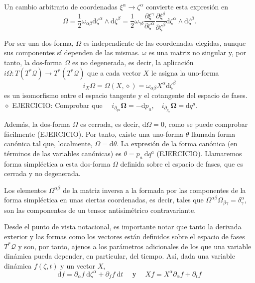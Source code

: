 Un cambio arbitrario de coordenadas $\xi^{\alpha} \rightarrow \zeta^{\alpha}$ convierte esta expresión en
$$
\Omega=\frac{1}{2} \omega_{\alpha \beta} \mathrm{d} \zeta^{\alpha} \wedge \mathrm{d} \zeta^{\beta}=\frac{1}{2} \omega_{\gamma \delta} \frac{\partial \xi^{\gamma}}{\partial \zeta^{\alpha}} \frac{\partial \xi^{\delta}}{\partial \zeta^{\beta}} \mathrm{d} \zeta^{\alpha} \wedge \mathrm{d} \zeta^{\beta} .
$$

Por ser una dos-forma, $\Omega$ es independiente de las coordenadas elegidas, aunque sus componentes sí dependen de las mismas.
$\omega$ es una matriz no singular y, por tanto, la dos-forma $\Omega$ es no degenerada, es decir, la aplicación $i \Omega: T\left(T^{*} \mathscr{Q}\right) \rightarrow T^{*}\left(T^{*} \mathscr{Q}\right)$ que a cada vector $X$ le asigna la uno-forma
$$
i_{X} \Omega=\Omega(X, \diamond)=\omega_{\alpha \beta} X^{\alpha} \mathrm{d} \zeta^{\beta}
$$
es un isomorfismo entre el espacio tangente y el cotangente del espacio de fases. $\diamond$ EJERCICIO: Comprobar que $\quad i_{\partial_{q a}} \boldsymbol{\Omega}=-\mathrm{d} p_{a}, \quad i_{\partial_{p_{a}}} \boldsymbol{\Omega}=\mathrm{d} q^{a}$.

Además, la dos-forma $\Omega$ es cerrada, es decir, $\mathrm{d} \Omega=0$, como se puede comprobar fácilmente (EJERCICIO). Por tanto, existe una uno-forma $\theta$ llamada forma canónica tal que, localmente, $\Omega=\mathrm{d} \theta$. La expresión de la forma canónica (en términos de las variables canónicas) es $\theta=p_{a} \mathrm{~d} q^{a}$ (EJERCICIO). Llamaremos forma simpléctica a esta dos-forma $\Omega$ definida sobre el espacio de fases, que es cerrada y no degenerada.

Los elementos $\Omega^{\alpha \beta}$ de la matriz inversa a la formada por las componentes de la forma simpléctica en unas ciertas coordenadas, es decir, tales que $\Omega^{\alpha \beta} \Omega_{\beta \gamma}=\delta_{\gamma}^{\alpha}$, son las componentes de un tensor antisimétrico contravariante.

Desde el punto de vista notacional, es importante notar que tanto la derivada exterior y las formas como los vectores están definidos sobre el espacio de fases $T^{*} \mathscr{Q}$ y son, por tanto, ajenos a los parámetros adicionales de los que una variable dinámica pueda depender, en particular, del tiempo. Así, dada una variable dinámica $f(\zeta, t)$ y un vector $X$,
$$
\mathrm{d} f=\partial_{\alpha} f \mathrm{~d} \zeta^{\alpha}+\partial_{f} f \mathrm{~d} t \quad \text { у } \quad X f=X^{\alpha} \partial_{\alpha} f+\partial_{t} f
$$


